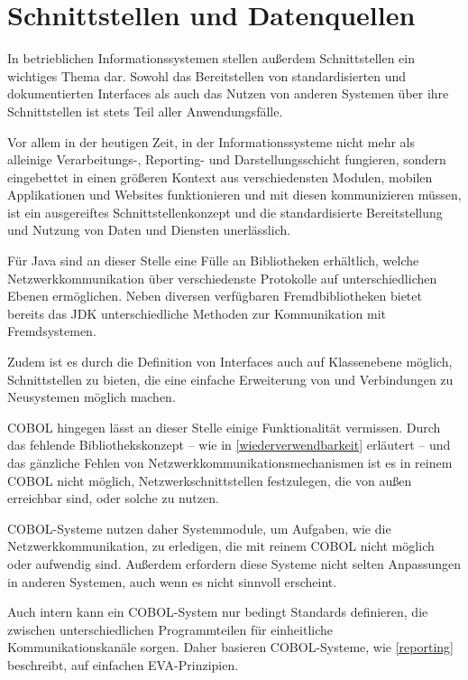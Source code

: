 \section{Schnittstellen und Datenquellen}\label{schnittstellenDatenquellen}

In betrieblichen Informationssystemen stellen außerdem Schnittstellen ein wichtiges Thema dar. Sowohl das Bereitstellen von standardisierten und dokumentierten Interfaces als auch das Nutzen von anderen Systemen über ihre Schnittstellen ist stets Teil aller Anwendungsfälle. 

Vor allem in der heutigen Zeit, in der Informationssysteme nicht mehr als alleinige Verarbeitungs-, Reporting- und Darstellungsschicht fungieren, sondern eingebettet in einen größeren Kontext aus verschiedensten Modulen, mobilen Applikationen und Websites funktionieren und mit diesen kommunizieren müssen, ist ein ausgereiftes Schnittstellenkonzept und die standardisierte Bereitstellung und Nutzung von Daten und Diensten unerlässlich.

Für Java sind an dieser Stelle eine Fülle an Bibliotheken erhältlich, welche Netzwerkkommunikation über verschiedenste Protokolle auf unterschiedlichen Ebenen ermöglichen. Neben diversen verfügbaren Fremdbibliotheken bietet bereits das JDK unterschiedliche Methoden zur Kommunikation mit Fremdsystemen.

Zudem ist es durch die Definition von Interfaces auch auf Klassenebene möglich, Schnittstellen zu bieten, die eine einfache Erweiterung von und Verbindungen zu Neusystemen möglich machen.

COBOL hingegen lässt an dieser Stelle einige Funktionalität vermissen. Durch das fehlende Bibliothekskonzept -- wie in \autoref{wiederverwendbarkeit} erläutert -- und das gänzliche Fehlen von Netzwerkkommunikationsmechanismen ist es in reinem COBOL nicht möglich, Netzwerkschnittstellen festzulegen, die von außen erreichbar sind, oder solche zu nutzen. 

COBOL-Systeme nutzen daher \idR Systemmodule, um Aufgaben, wie die Netzwerkkommunikation, zu erledigen, die mit reinem COBOL nicht möglich oder aufwendig sind. Außerdem erfordern diese Systeme nicht selten Anpassungen in anderen Systemen, auch wenn es nicht sinnvoll erscheint.

Auch intern kann ein COBOL-System nur bedingt Standards definieren, die zwischen unterschiedlichen Programmteilen für einheitliche Kommunikationskanäle sorgen. Daher basieren COBOL-Systeme, wie \autoref{reporting} beschreibt, auf einfachen EVA-Prinzipien. 

